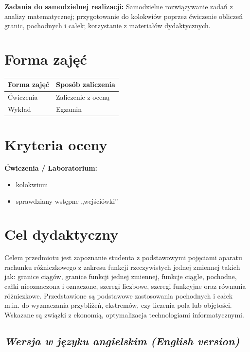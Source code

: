 \documentclass[12pt, a4paper]{article}
\newcommand{\thdrule}{\noalign{\global\setlength{\extrarowheight}{0pt}}}
\newcommand{\thdend}{\noalign{\global\setlength{\extrarowheight}{3pt}}}
\begin{document}
\vspace{4pt}
\noindent\textbf{Zadania do samodzielnej realizacji:} Samodzielne rozwiązywanie zadań z analizy matematycznej; przygotowanie do kolokwiów poprzez ćwiczenie obliczeń granic, pochodnych i całek; korzystanie z materiałów dydaktycznych.

\section{Forma zajęć}

\begin{center}
{\scriptsize
\begin{tabular}{m{5cm}m{8cm}}
\thdrule\toprule
\rowcolor{pjatkRed} {\color{white}\textbf{Forma zajęć}} & {\color{white}\textbf{Sposób zaliczenia}} \\
\midrule\thdend
  \rowcolor{tableRowLight} Ćwiczenia & Zaliczenie z oceną \\
  \rowcolor{tableRowAlt} Wykład & Egzamin \\
\bottomrule
\end{tabular}}
\end{center}

\section{Kryteria oceny}

\textbf{Ćwiczenia / Laboratorium:}
\begin{itemize}
  \item kolokwium
  \item sprawdziany wstępne „wejściówki''
\end{itemize}


\section{Cel dydaktyczny}

Celem przedmiotu jest zapoznanie studenta z podstawowymi pojęciami aparatu rachunku różniczkowego z zakresu funkcji rzeczywistych jednej zmiennej takich jak: granice ciągów, granice funkcji jednej zmiennej, funkcje ciągłe, pochodne, całki nieoznaczona i oznaczone, szeregi liczbowe, szeregi funkcyjne oraz równania różniczkowe. Przedstawione są podstawowe zastosowania  pochodnych i całek m.in. do wyznaczania przybliżeń, ekstremów,  czy  liczenia pola lub objętości. Wskazane są związki z ekonomią, optymalizacja technologiami  informatycznymi.

\subsection*{\textit{Wersja w języku angielskim (English version)}}
\end{document}
